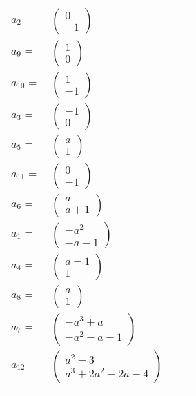 \documentclass[1p]{elsarticle_modified}
\theoremstyle{definition}
\begin{document}
\begin{tabular}{m{7pt} m{180pt} m{7pt} m{180pt} }
\flushright $a_{2}=$&$\begin{pmatrix}0\\-1\end{pmatrix}$ \\
\flushright $a_{9}=$&$\begin{pmatrix}1\\0\end{pmatrix}$ \\
\flushright $a_{10}=$&$\begin{pmatrix}1\\-1\end{pmatrix}$ \\
\flushright $a_{3}=$&$\begin{pmatrix}-1\\0\end{pmatrix}$ \\
\flushright $a_{5}=$&$\begin{pmatrix}a\\1\end{pmatrix}$ \\
\flushright $a_{11}=$&$\begin{pmatrix}0\\-1\end{pmatrix}$ \\
\flushright $a_{6}=$&$\begin{pmatrix}a\\a+1\end{pmatrix}$ \\
\flushright $a_{1}=$&$\begin{pmatrix}- a^2\\- a-1\end{pmatrix}$ \\
\flushright $a_{4}=$&$\begin{pmatrix}a-1\\1\end{pmatrix}$ \\
\flushright $a_{8}=$&$\begin{pmatrix}a\\1\end{pmatrix}$ \\
\flushright $a_{7}=$&$\begin{pmatrix}- a^3+a\\- a^2- a+1\end{pmatrix}$ \\
\flushright $a_{12}=$&$\begin{pmatrix}a^2-3\\a^3+2 a^2-2 a-4\end{pmatrix}$\\&\end{tabular}
\end{document}
